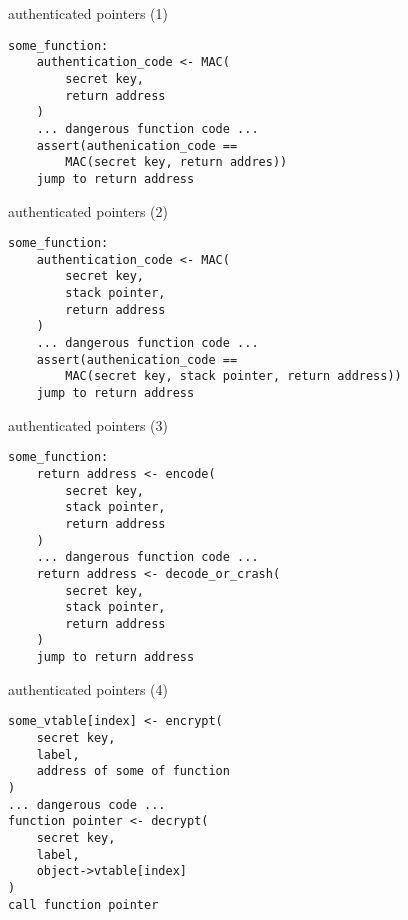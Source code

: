 \begin{frame}[fragile,label=authPtr1]{authenticated pointers (1)}
\begin{lstlisting}[language={},style=smaller]
some_function:
    authentication_code <- MAC(
        secret key, 
        return address
    )
    ... dangerous function code ...
    assert(authenication_code ==
        MAC(secret key, return addres))
    jump to return address
\end{lstlisting}
\end{frame}

\begin{frame}[fragile,label=authPtr2]{authenticated pointers (2)}
\begin{lstlisting}[language={},style=smaller]
some_function:
    authentication_code <- MAC(
        secret key,
        stack pointer, 
        return address
    )
    ... dangerous function code ...
    assert(authenication_code ==
        MAC(secret key, stack pointer, return address))
    jump to return address
\end{lstlisting}
\end{frame}


\begin{frame}[fragile,label=authPtr3]{authenticated pointers (3)}
\begin{lstlisting}[language={},style=smaller]
some_function:
    return address <- encode(
        secret key,
        stack pointer, 
        return address
    )
    ... dangerous function code ...
    return address <- decode_or_crash(
        secret key,
        stack pointer, 
        return address
    )
    jump to return address
\end{lstlisting}
\end{frame}

\begin{frame}[fragile,label=authPtr4]{authenticated pointers (4)}
\begin{lstlisting}[language={},style=smaller]
some_vtable[index] <- encrypt(
    secret key,
    label,
    address of some of function
)
... dangerous code ...
function pointer <- decrypt(
    secret key,
    label,
    object->vtable[index]
)
call function pointer
\end{lstlisting}
\end{frame}


